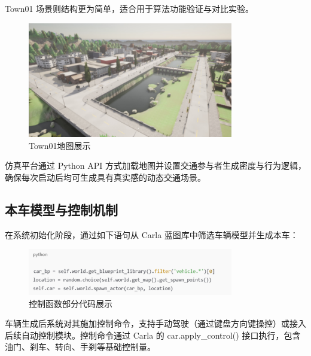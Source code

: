 Town01 场景则结构更为简单，适合用于算法功能验证与对比实验。

\begin{figure}[H]
    \centering
    \includegraphics[width=0.8\textwidth]{images/图5 Town01地图展示.pdf}  %
    \caption{Town01地图展示}
    \label{fig:example_image}  %
\end{figure}

仿真平台通过 Python API 方式加载地图并设置交通参与者生成密度与行为逻辑，确保每次启动后均可生成具有真实感的动态交通场景。

\subsection{本车模型与控制机制}

在系统初始化阶段，通过如下语句从 Carla 蓝图库中筛选车辆模型并生成本车：

\begin{figure}[H]
    \centering
    \includegraphics[width=0.8\textwidth]{images/图6 控制函数部分代码展示.pdf}  %
    \caption{控制函数部分代码展示}
    \label{fig:example_image}  %
\end{figure}

车辆生成后系统对其施加控制命令，支持手动驾驶（通过键盘方向键操控）或接入后续自动控制模块。控制命令通过 Carla 的 car.apply\_control() 接口执行，包含油门、刹车、转向、手刹等基础控制量。

